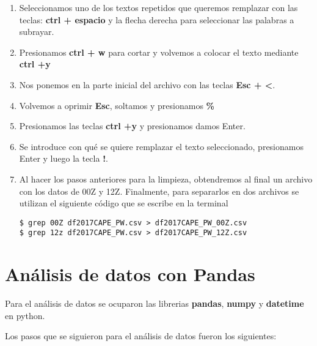 \documentclass[a4paper]{article}
\begin{document}
\begin{enumerate}
\item Seleccionamos uno de los textos repetidos que queremos remplazar con las teclas: \textbf{ctrl + espacio} y la flecha derecha para seleccionar las palabras a subrayar. 

\item Presionamos \textbf{ctrl + w} para cortar y volvemos a colocar el texto mediante \textbf{ctrl +y}

\item Nos ponemos en la parte inicial del archivo con las teclas \textbf{Esc + <}.

\item Volvemos a oprimir \textbf{Esc}, soltamos y presionamos \textbf{\%}

\item Presionamos las teclas \textbf{ctrl +y} y presionamos damos Enter.

\item Se introduce con qué se quiere remplazar el texto seleccionado, presionamos Enter y luego la tecla \textbf{!}.

\item Al hacer los pasos anteriores para la limpieza, obtendremos al final un archivo con los datos de 00Z y 12Z. Finalmente, para separarlos en dos archivos se utilizan el siguiente código que se escribe en la terminal
\begin{verbatim}
$ grep 00Z df2017CAPE_PW.csv > df2017CAPE_PW_00Z.csv
$ grep 12z df2017CAPE_PW.csv > df2017CAPE_PW_12Z.csv
\end{verbatim}
\end{enumerate}

\section{Análisis de datos con Pandas}

Para el análisis de datos se ocuparon las librerias \textbf{pandas}, \textbf{numpy} y \textbf{datetime} en python.

Los pasos que se siguieron para el análisis de datos fueron los siguientes:
\end{document}

